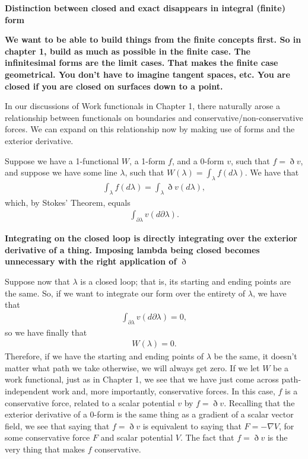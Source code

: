 \documentclass{book}
\begin{document}
\textbf{Distinction between closed and exact disappears in integral (finite) form}

\textbf{We want to be able to build things from the finite concepts first. So in chapter 1, build as much as possible in the finite case. The infinitesimal forms are the limit cases. That makes the finite case geometrical. You don't have to imagine tangent spaces, etc. You are closed if you are closed on surfaces down to a point.}

In our discussions of Work functionals in Chapter 1, there naturally arose a relationship between functionals on boundaries and conservative/non-conservative forces. We can expand on this relationship now by making use of forms and the exterior derivative. 

Suppose we have a 1-functional $W$, a 1-form $f$, and a 0-form $v$, such that $f = \eth v$, and suppose we have some line $\lambda$, such that $W(\lambda) = \int_\lambda f(d\lambda)$. We have that \begin{gather}\int_\lambda f(d\lambda) = \int_\lambda \eth v(d\lambda),\end{gather} which, by Stokes' Theorem, equals \begin{gather} \int_{\partial\lambda} v(d\partial\lambda).\end{gather}

\textbf{Integrating on the closed loop is directly integrating over the exterior derivative of a thing. Imposing lambda being closed becomes unnecessary with the right application of $\eth$}

Suppose now that $\lambda$ is a closed loop; that is, its starting and ending points are the same. So, if we want to integrate our form over the entirety of $\lambda$, we have that \begin{gather} \int_{\partial\lambda} v(d\partial\lambda) = 0,\end{gather} so we have finally that \begin{gather} W(\lambda) = 0.\end{gather} Therefore, if we have the starting and ending points of $\lambda$ be the same, it doesn't matter what path we take otherwise, we will always get zero. If we let $W$ be a work functional, just as in Chapter 1, we see that we have just come across path-independent work and, more importantly, conservative forces. In this case, $f$ is a conservative force, related to a scalar potential $v$ by $f = \eth v$. Recalling that the exterior derivative of a 0-form is the same thing as a gradient of a scalar vector field, we see that saying that $f = \eth v$ is equivalent to saying that $F = -\nabla V$, for some conservative force $F$ and scalar potential $V$. The fact that $f = \eth v$ is the very thing that makes $f$ conservative.  
\end{document}
